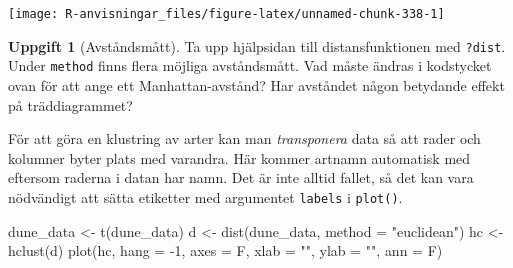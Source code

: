 \documentclass[
]{book}
\newenvironment{Shaded}{\begin{snugshade}}{\end{snugshade}}
\newcommand{\AttributeTok}[1]{\textcolor[rgb]{0.77,0.63,0.00}{#1}}
\newcommand{\DecValTok}[1]{\textcolor[rgb]{0.00,0.00,0.81}{#1}}
\newcommand{\FunctionTok}[1]{\textcolor[rgb]{0.00,0.00,0.00}{#1}}
\newcommand{\NormalTok}[1]{#1}
\newcommand{\OtherTok}[1]{\textcolor[rgb]{0.56,0.35,0.01}{#1}}
\newcommand{\SpecialCharTok}[1]{\textcolor[rgb]{0.00,0.00,0.00}{#1}}
\newcommand{\StringTok}[1]{\textcolor[rgb]{0.31,0.60,0.02}{#1}}
\theoremstyle{definition}
\theoremstyle{definition}
\theoremstyle{definition}
\newtheorem{exercise}{Uppgift}[chapter]
\theoremstyle{definition}
\theoremstyle{remark}
\begin{document}
\begin{Shaded}
\end{Shaded}

\begin{center}\texttt{[image: R-anvisningar\_files/figure-latex/unnamed-chunk-338-1]} \end{center}

\begin{exercise}[Avståndsmått]
Ta upp hjälpsidan till distansfunktionen med \texttt{?dist}. Under \texttt{method} finns flera möjliga avståndsmått. Vad måste ändras i kodstycket ovan för att ange ett Manhattan-avstånd? Har avståndet någon betydande effekt på träddiagrammet?
\end{exercise}

För att göra en klustring av arter kan man \emph{transponera} data så att rader och kolumner byter plats med varandra. Här kommer artnamn automatisk med eftersom raderna i datan har namn. Det är inte alltid fallet, så det kan vara nödvändigt att sätta etiketter med argumentet \texttt{labels} i \texttt{plot()}.

\begin{Shaded}
\begin{Highlighting}[]
\NormalTok{dune\_data }\OtherTok{\textless{}{-}} \FunctionTok{t}\NormalTok{(dune\_data)}
\NormalTok{d }\OtherTok{\textless{}{-}} \FunctionTok{dist}\NormalTok{(dune\_data, }\AttributeTok{method =} \StringTok{"euclidean"}\NormalTok{)}
\NormalTok{hc }\OtherTok{\textless{}{-}} \FunctionTok{hclust}\NormalTok{(d)}
\FunctionTok{plot}\NormalTok{(hc, }\AttributeTok{hang =} \SpecialCharTok{{-}}\DecValTok{1}\NormalTok{,}
     \AttributeTok{axes =}\NormalTok{ F, }\AttributeTok{xlab =} \StringTok{""}\NormalTok{, }\AttributeTok{ylab =} \StringTok{""}\NormalTok{, }\AttributeTok{ann =}\NormalTok{ F)}
\end{Highlighting}
\end{Shaded}
\end{document}

